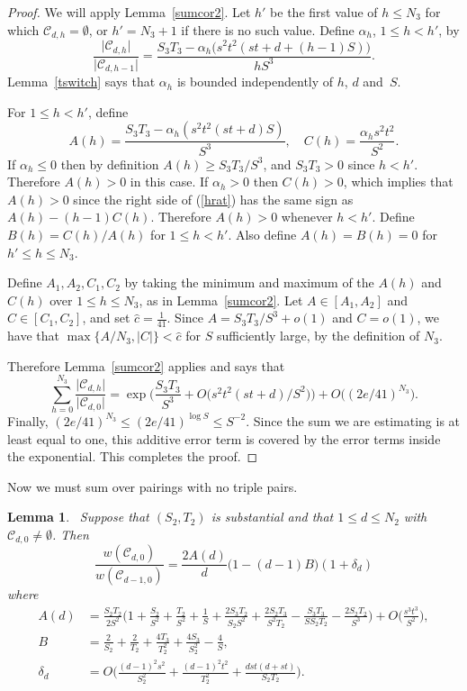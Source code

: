 \documentclass[12pt]{article}
\newtheorem{lemma}[theorem]{Lemma}
\numberwithin{equation}{section}
\def\C{{\mathcal{C}}}
\def\({\bigl(}   \def\){\bigr)}
\def\abs#1{\mathopen|#1\mathclose|} \let\card=\abs
\def\ac#1{\card{\C_{#1}}}
\begin{document}
\begin{proof}
We will apply Lemma~\ref{sumcor2}.
Let $h'$ be the first value of $h\leq N_3$ for which $\C_{d,h}=\emptyset$, or
$h'=N_3+1$ if there is no such value.
Define $\alpha_h$, $1\le h < h'$, by
\begin{equation}\label{hrat}
\frac{\ac{d,h}}{\ac{d,h-1}} 
  =  \frac{S_3T_3 -  \alpha_h\(s^2t^2(st+d+(h-1)S)\)}{hS^3}.
\end{equation}
Lemma~\ref{tswitch} says that $\alpha_h$ is bounded independently
of $h$, $d$ and~$S$.

For $1\le h < h'$, define
\[ A(h)= \frac{S_3T_3 - \alpha_h(s^2t^2(st+d)S)}{S^3},\quad
   C(h) = \frac{\alpha_h s^2t^2}{S^2}.\]
If $\alpha_h \le 0$ then by definition
$A(h) \geq S_3T_3/S^3$, and $S_3T_3> 0$ 
since $h<h'$. Therefore $A(h) > 0$ in this case.
If $\alpha_h > 0$ then $C(h) > 0$, which implies that $A(h) > 0$ since the
right side of (\ref{hrat}) 
has the same sign as $A(h) - (h-1)C(h)$. 
Therefore $A(h)>0$ whenever $h<h'$.
Define $B(h)=C(h)/A(h)$ for $1\leq h < h'$.
Also define $A(h)=B(h)=0$ for $h'\le h\le N_3$.

Define
$A_1,A_2, C_1,C_2$ by taking the minimum and maximum of the
$A(h)$ and $C(h)$ over $1\leq h\leq N_3$, as in Lemma~\ref{sumcor2}.  
Let $A\in [A_1,A_2]$ and $C\in [C_1,C_2]$, and set
$\hat{c}=\tfrac1{41}$.
Since $A=S_3T_3/S^3+o(1)$ and $C=o(1)$, we have that
$\max\{A/N_3,\abs{C}\}<\hat{c}$  
for $S$ sufficiently large, by the definition of $N_3$.

Therefore Lemma~\ref{sumcor2} applies and says that
\[ \sum_{h=0}^{N_3} \frac{\ac{d,h}}{\ac{d,0}}
   = \exp\biggl( \frac{S_3T_3}{S^3}
            + O\(s^2t^2(st+d)/S^2\)\biggr) + 
                             O\((2e/41)^{N_3}\).\]
Finally, $(2e/41)^{N_3} \leq (2e/41)^{\log S} \leq S^{-2}$.
Since the sum we are estimating is at least equal to one, this additive
error term is covered by the error terms inside the exponential.
This completes the proof.
\end{proof}

\bigskip

Now we must sum over pairings with no triple pairs.

\begin{lemma}
\label{dswitch}
\ Suppose that $(S_2,T_2)$ is substantial and that $1\leq d\le N_2$
with $\C_{d,0}\neq \emptyset$.  Then
\[ 
 \frac{w(\C_{d,0})}{w(\C_{d-1,0})} 
  =  \frac{2A(d)}{d}\(1 - (d-1)B\)
        (1+ \delta_d)
\]
where
\begin{align*}
A(d) &= \frac{S_2T_2}{2S^2} \biggl(1 + \frac{S_2}{S^2} + \frac{T_2}{S^2} + 
 \frac{1}{S} + \frac{2S_3T_2}{S_2S^2} + \frac{2S_2T_3}{S^2 T_2}
- \frac{S_3T_3}{SS_2T_2} - \frac{2 S_2T_2}{S^3} \biggr)
  + O\biggl(\frac{s^3t^3}{S^2}\biggr),\\
B &= 
 \frac{2}{S_2} + \frac{2}{T_2} + \frac{4T_3}{T_2^2} +
       \frac{4S_3}{S_2^2} - \frac{4}{S},\\
\delta_d &= O\biggl(\frac{(d-1)^2s^2}{S_2^2} 
 + \frac{(d-1)^2t^2}{T_2^2} +
                \frac{dst(d+st)}{S_2T_2}\biggr).
\end{align*}
\end{lemma}
\end{document}
